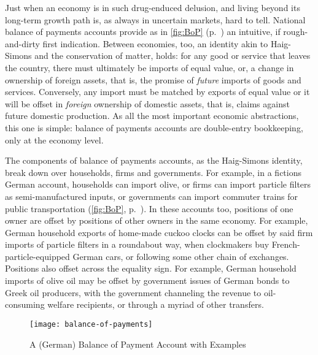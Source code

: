 Just when an economy is in such drug-enduced delusion, and living beyond its long-term growth path is, as always in uncertain markets, hard to tell. National balance of payments accounts provide as in \autoref{fig:BoP} (p.~\pageref{fig:BoP}) an intuitive, if rough-and-dirty first indication. Between economies, too, an identity akin to Haig-Simons and the conservation of matter, holds: for any good or service that leaves the country, there must ultimately be imports of equal value, or, a change in ownership of foreign assets, that is, the promise of \emph{future} imports of goods and services. Conversely, any import must be matched by exports of equal value or it will be offset in \emph{foreign} ownership of domestic assets, that is, claims against future domestic production. As all the most important economic abstractions, this one is simple: balance of payments accounts are double-entry bookkeeping, only at the economy level.  

The components of balance of payments accounts, as the Haig-Simons identity, break down over households, firms and governments. For example, in a fictions German account, households can import olive, or firms can import particle filters as semi-manufactured inputs, or governments can import commuter trains for public transportation (\autoref{fig:BoP}, p.~\pageref{fig:BoP}). In these accounts too, positions of one owner are offset by positions of other owners in the same economy. For example, German household exports of home-made cuckoo clocks can be offset by said firm imports of particle filters in a roundabout way, when clockmakers buy French-particle-equipped German cars, or following some other chain of exchanges. Positions  also offset across the equality sign. For example, German household imports of olive oil may be offset by government issues of German bonds to Greek oil producers, with the government channeling the revenue to oil-consuming welfare recipients, or through a myriad of other transfers.

\begin{figure}[htbp]
	\begin{center}
	\texttt{[image: balance-of-payments]}  
	\caption{A (German) Balance of Payment Account with Examples}
	\label{fig:balance-of-payments}
	\end{center}
\end{figure}

